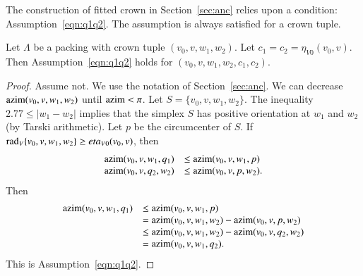 The construction of fitted crown in Section~\ref{sec:anc} 
relies upon a condition: Assumption~\ref{eqn:q1q2}.  
The assumption is always satisfied for a crown tuple.

\begin{lemma}
Let $\Lambda$ be a packing with crown tuple
$(v_0,v,w_1,w_2)$.  Let $c_1=c_2=\eta_{V0}(v_0,v)$. 
Then Assumption~\ref{eqn:q1q2} holds for $(v_0,v,w_1,w_2,c_1,c_2)$.
\end{lemma}

\begin{proof} Assume not.  
We use the notation of Section~\ref{sec:anc}.
We can decrease ${\operatorname{azim}}(v_0,v,w_1,w_2)$
until ${\operatorname{azim}}<\pi$.  Let $S=\{v_0,v,w_1,w_2\}$.
The inequality $2.77 \le |w_1-w_2|$ implies that the simplex $S$
has positive orientation at $w_1$ and $w_2$ (by Tarski arithmetic). 
Let $p$ be the circumcenter of $S$.
If $\operatorname{rad}_V\{v_0,v,w_1,w_2\}\ge eta_{V0}(v_0,v)$, then
  $$
  \begin{array}{lll}
  {\operatorname{azim}}(v_0,v,w_1,q_1)&\le {\operatorname{azim}}(v_0,v,w_1,p)\\
  {\operatorname{azim}}(v_0,v,q_2,w_2)&\le {\operatorname{azim}}(v_0,v,p,w_2).
  \end{array}
  $$
Then 
  $$
  \begin{array}{lll}
  {\operatorname{azim}}(v_0,v,w_1,q_1) &\le {\operatorname{azim}}(v_0,v,w_1,p)\\
    &= {\operatorname{azim}}(v_0,v,w_1,w_2) - {\operatorname{azim}}(v_0,v,p,w_2)\\
    &\le {\operatorname{azim}}(v_0,v,w_1,w_2) - {\operatorname{azim}}(v_0,v,q_2,w_2)\\
    &= {\operatorname{azim}}(v_0,v,w_1,q_2).
  \end{array}
  $$
This is Assumption~\ref{eqn:q1q2}. 
\end{proof}



